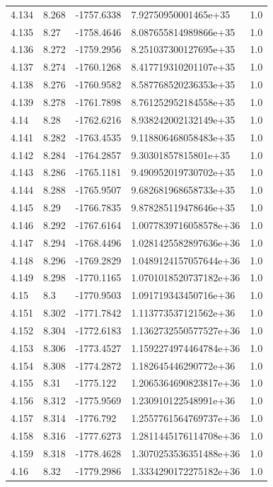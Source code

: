 \begin{tabular}{lllll}
4.134 & 8.268 & -1757.6338 & 7.92750950001465e+35 & 1.0 \\
4.135 & 8.27 & -1758.4646 & 8.087655814989866e+35 & 1.0 \\
4.136 & 8.272 & -1759.2956 & 8.251037300127695e+35 & 1.0 \\
4.137 & 8.274 & -1760.1268 & 8.417719310201107e+35 & 1.0 \\
4.138 & 8.276 & -1760.9582 & 8.587768520236353e+35 & 1.0 \\
4.139 & 8.278 & -1761.7898 & 8.761252952184558e+35 & 1.0 \\
4.14 & 8.28 & -1762.6216 & 8.938242002132149e+35 & 1.0 \\
4.141 & 8.282 & -1763.4535 & 9.118806468058483e+35 & 1.0 \\
4.142 & 8.284 & -1764.2857 & 9.30301857815801e+35 & 1.0 \\
4.143 & 8.286 & -1765.1181 & 9.490952019730702e+35 & 1.0 \\
4.144 & 8.288 & -1765.9507 & 9.682681968658733e+35 & 1.0 \\
4.145 & 8.29 & -1766.7835 & 9.878285119478646e+35 & 1.0 \\
4.146 & 8.292 & -1767.6164 & 1.0077839716058578e+36 & 1.0 \\
4.147 & 8.294 & -1768.4496 & 1.0281425582897636e+36 & 1.0 \\
4.148 & 8.296 & -1769.2829 & 1.0489124157057644e+36 & 1.0 \\
4.149 & 8.298 & -1770.1165 & 1.0701018520737182e+36 & 1.0 \\
4.15 & 8.3 & -1770.9503 & 1.091719343450716e+36 & 1.0 \\
4.151 & 8.302 & -1771.7842 & 1.113773537121562e+36 & 1.0 \\
4.152 & 8.304 & -1772.6183 & 1.1362732550577527e+36 & 1.0 \\
4.153 & 8.306 & -1773.4527 & 1.1592274974464784e+36 & 1.0 \\
4.154 & 8.308 & -1774.2872 & 1.182645446290772e+36 & 1.0 \\
4.155 & 8.31 & -1775.122 & 1.2065364690823817e+36 & 1.0 \\
4.156 & 8.312 & -1775.9569 & 1.230910122548991e+36 & 1.0 \\
4.157 & 8.314 & -1776.792 & 1.2557761564769737e+36 & 1.0 \\
4.158 & 8.316 & -1777.6273 & 1.2811445176114708e+36 & 1.0 \\
4.159 & 8.318 & -1778.4628 & 1.3070253536351488e+36 & 1.0 \\
4.16 & 8.32 & -1779.2986 & 1.3334290172275182e+36 & 1.0 \\

\end{tabular}
